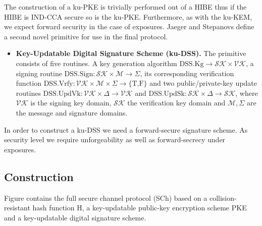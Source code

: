 \documentclass[11pt,a4paper,twoside,openright,bibliography=totoc]{scrbook}
\renewcommand{\t}{\text} %
\begin{document}
The construction of a ku-PKE is trivially performed out of a HIBE thus if
the HIBE is IND-CCA secure so is the ku-PKE. Furthermore, as with the
ku-KEM, we expect forward security in the case of exposures.
Jaeger and Stepanovs define a second novel primitive for use in the final protocol.
\begin{itemize}
\item \textbf{Key-Updatable Digital Signature Scheme (ku-DSS).} The primitive
  consists of five routines. A key generation algorithm
  $\t{DSS.Kg} \rightarrow \mathcal{SK} \times \mathcal{VK}$, a signing routine
  $\t{DSS.Sign}: \mathcal{SK} \times \mathcal{M} \rightarrow \Sigma$, its
  corresponding verification function
  $\t{DSS.Vrfy}: \mathcal{VK} \times \mathcal{M} \times \Sigma \rightarrow \{\t{T,F}\}$ and
  two public/private-key update routines
  $\t{DSS.UpdVk}: \mathcal{VK} \times \Delta \rightarrow \mathcal{VK}$ and
  $\t{DSS.UpdSk}: \mathcal{SK} \times \Delta \rightarrow \mathcal{SK}$, where
  $\mathcal{VK}$ is the signing key domain, $\mathcal{SK}$ the verification key
  domain and $\mathcal{M}, \Sigma$ are the message and signature domains.
\end{itemize}

In order to construct a ku-DSS we need a forward-secure signature scheme. As
security level we require unforgeability as well as forward-secrecy under
exposures. 

\subsection{Construction}
\label{sec:construction-1}

Figure contains the full secure channel protocol (SCh) based on a collision-resistant
hash function H, a key-updatable public-key encryption scheme PKE and
a key-updatable digital signature scheme.

\end{document}
